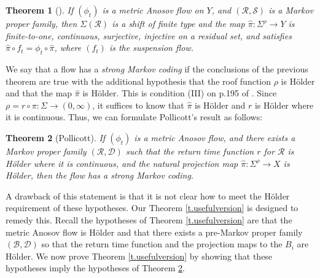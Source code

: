 \documentclass[JEP,XML,SOM,Unicode,NoFloatCountersInSection]{cedram}
\let\mathcal\mathscr
\newtheorem{thm}{Theorem}[section]
\theoremstyle{definition}
\numberwithin{equation}{section}
\newcommand\DDD{\mathcal D}
\newcommand\BBB{\mathcal B}
\newcommand\RRR{\mathcal R}
\newcommand\SSS{\mathcal S}
\begin{document}
\begin{thm}[{\cite[Th.\,1]{pollicott}}]
If $(\phi_t)$ is a metric Anosov flow on $Y$, and $(\RRR, \SSS)$ is a Markov proper family, then $\Sigma(\RRR)$ is a shift of finite type and the map $\hat\pi: \Sigma^\rho \to Y$ is finite-to-one, continuous, surjective, injective on a residual set, and satisfies $\hat \pi \circ f_t = \phi_t \circ \hat \pi$, where $(f_t)$ is the suspension flow.
\end{thm}

We say that a flow has a \emph{strong Markov coding} if the conclusions of the previous theorem are true with the additional hypothesis that the roof function $\rho$ is Hölder and that the map $\hat \pi$ is Hölder. This is condition (III) on p.195 of \cite{pollicott}. Since $\rho= r \circ \pi: \Sigma \to (0, \infty)$, it suffices to know that $\hat\pi$ is Hölder and $r$ is Hölder where it is continuous. Thus, we can formulate Pollicott's result as follows:

\begin{thm} [Pollicott] \label{t.pollicott}
If $(\phi_t)$ is a metric Anosov flow, and there exists a Markov proper family $(\RRR, \DDD)$ such that the return time function $r$ for $\RRR$ is Hölder where it is continuous, and the natural projection map $\hat \pi: \Sigma^\rho \to X$ is Hölder, then the flow has a strong Markov coding.
\end{thm}

A drawback of this statement is that it is not clear how to meet the Hölder \hbox{requirement} of these hypotheses. Our Theorem \ref{t.usefulversion} is designed to remedy this. Recall the hypotheses of Theorem \ref{t.usefulversion} are that the metric Anosov flow is Hölder and that there exists a pre-Markov proper family $(\BBB, \DDD)$ so that the return time function and the projection maps to the $B_i$ are Hölder. We now prove Theorem \ref{t.usefulversion} by showing that these hypotheses imply the hypotheses of Theorem \ref{t.pollicott}.
\end{document}
